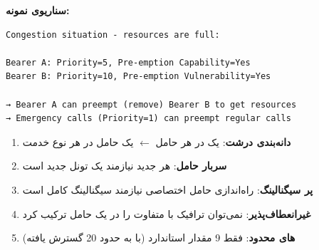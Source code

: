 \textbf{سناریوی نمونه:}

\def\CNcodelang{}

\begin{CNplaincode}
\begin{Verbatim}
Congestion situation - resources are full:

Bearer A: Priority=5, Pre-emption Capability=Yes
Bearer B: Priority=10, Pre-emption Vulnerability=Yes

→ Bearer A can preempt (remove) Bearer B to get resources
→ Emergency calls (Priority=1) can preempt regular calls
\end{Verbatim}
\end{CNplaincode}





\begin{enumerate}
\def\labelenumi{\arabic{enumi}.}
\tightlist
\item
  \textbf{دانه‌بندی درشت}: یک  در هر حامل \ensuremath{\leftarrow} یک حامل در هر نوع خدمت
\item
  \textbf{سربار حامل}: هر  جدید نیازمند یک تونل  جدید است
\item
  \textbf{پر سیگنالینگ}: راه‌اندازی حامل اختصاصی نیازمند سیگنالینگ کامل  است
\item
  \textbf{غیرانعطاف‌پذیر}: نمی‌توان ترافیک با  متفاوت را در یک حامل ترکیب کرد
\item
  \textbf{های محدود}: فقط 9 مقدار استاندارد (با  به حدود 20 گسترش یافته)
\end{enumerate}




\CNchained{}


